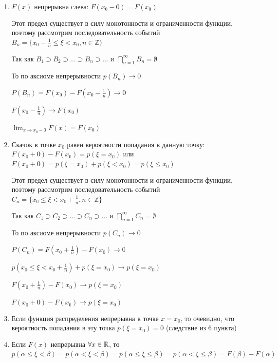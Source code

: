 \documentclass[12pt]{article}
\begin{document}
\begin{enumerate}
        \item $F(x)$ непрерывна слева: $F(x_0 - 0) = F(x_0)$

        \begin{MyProof}
            Этот предел существует в силу монотонности и ограниченности функции, поэтому рассмотрим последовательность событий $B_n = \{x_0 - \frac{1}{n} \leq \xi < x_0, n \in \mathbb{Z}\}$

            Так как $B_1 \supset B_2 \supset \dots \supset B_n \supset \dots$ и $\bigcap_{n = 1}^\infty B_n = \emptyset$

            То по аксиоме непрерывности $p(B_n) \to 0$

            $P(B_n) = F(x_0) - F(x_0 - \frac{1}{n}) \rightarrow 0$

            $F(x_0 - \frac{1}{n}) \to F(x_0)$

            $\lim_{x \to x_0 - 0} F(x) = F(x_0)$
        \end{MyProof}
        
        \item Скачок в точке $x_0$ равен вероятности попадания в данную точку: $F(x_0 + 0) - F(x_0) = p(\xi = x_0)$ или $F(x_0 + 0) = p(\xi = x_0) + p(\xi < x_0) = p(\xi \leq x_0)$

        \begin{MyProof}
            Этот предел существует в силу монотонности и ограниченности функции, поэтому рассмотрим последовательность событий $C_n = \{x_0 \leq \xi < x_0 + \frac{1}{n}, n \in \mathbb{Z}\}$

            Так как $C_1 \supset C_2 \supset \dots \supset C_n \supset \dots$ и $\bigcap_{n = 1}^\infty C_n = \emptyset$

            То по аксиоме непрерывности $p(C_n) \to 0$

            $P(C_n) = F(x_0 + \frac{1}{n}) - F(x_0) \rightarrow 0$

            $p(x_0 \leq \xi < x_0 + \frac{1}{n}) + p(\xi = x_0) \rightarrow p(\xi = x_0)$

            $F(x_0 + \frac{1}{n}) - F(x_0) \to p(\xi = x_0)$

            $F(x_0 + 0) - F(x_0) \to p(\xi = x_0)$
        \end{MyProof}
        
        \item Если функция распределения непрерывна в точке $x = x_0$, то очевидно, что вероятность попадания в эту точка $p(\xi = x_0) = 0$ (следствие из 6 пункта)
        
        \item Если $F(x)$ непрерывна $\forall x \in \mathbb{R}$, то $p(\alpha \leq \xi < \beta) = p(\alpha < \xi < \beta) = p(\alpha \leq \xi \leq \beta) = p(\alpha < \xi \leq \beta) = F(\beta) - F(\alpha)$
    \end{enumerate}
\end{document}
